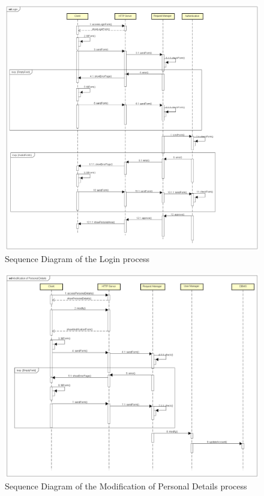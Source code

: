 \begin{figure}[H]	
	\centering
	\includegraphics[width=\textwidth]{img/sequence_login}
	\caption{Sequence Diagram of the Login process}
\end{figure}
\newpage

\begin{figure}[H]	
	\centering
	\includegraphics[width=\textwidth]{img/sequence_modification}
	\caption{Sequence Diagram of the Modification of Personal Details process}
\end{figure}
\newpage

